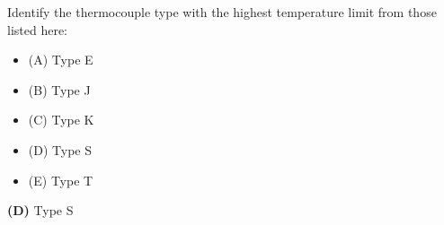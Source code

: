 

Identify the thermocouple type with the highest temperature limit from those listed here:

\begin{itemize}
\item{(A)} Type E
\vskip 5pt 
\item{(B)} Type J
\vskip 5pt 
\item{(C)} Type K
\vskip 5pt 
\item{(D)} Type S
\vskip 5pt 
\item{(E)} Type T
\end{itemize}







{\bf (D)} Type S
 









